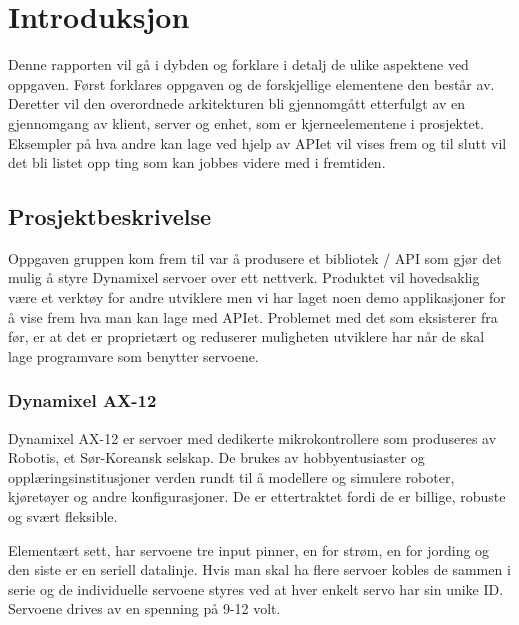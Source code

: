 \documentclass[12pt]{report}
\begin{document}
\tableofcontents


\chapter{Introduksjon}
Denne rapporten vil gå i dybden og forklare i detalj de ulike aspektene ved oppgaven.
Først forklares oppgaven og de forskjellige elementene den består av. Deretter vil den overordnede arkitekturen bli gjennomgått etterfulgt av en gjennomgang av klient, server og enhet, som er kjerneelementene i prosjektet.
Eksempler på hva andre kan lage ved hjelp av APIet vil vises frem og til slutt vil det bli listet opp ting som kan jobbes videre med i fremtiden.

\section{Prosjektbeskrivelse}
Oppgaven gruppen kom frem til var å produsere et bibliotek / API som gjør det mulig å styre Dynamixel servoer\cite{Dynamixel} over ett nettverk. Produktet vil hovedsaklig være et verktøy for andre utviklere men vi har laget noen demo applikasjoner for å vise frem hva man kan lage med APIet. Problemet med det som eksisterer fra før, er at det er proprietært og reduserer muligheten utviklere har når de skal lage programvare som benytter servoene.

\subsection{Dynamixel AX-12}
Dynamixel AX-12 er servoer med dedikerte mikrokontrollere som produseres av Robotis, et Sør-Koreansk selskap. De brukes av hobbyentusiaster og opplæringsinstitusjoner verden rundt til å modellere og simulere roboter, kjøretøyer og andre konfigurasjoner. De er ettertraktet fordi de er billige, robuste og svært fleksible. 

Elementært sett, har servoene tre input pinner, en for strøm, en for jording og den siste er en seriell datalinje. Hvis man skal ha flere servoer kobles de sammen i serie og de individuelle servoene styres ved at hver enkelt servo har sin unike ID. Servoene drives av en spenning på 9-12 volt.
\end{document}
